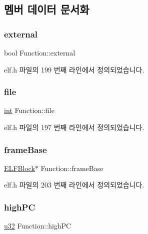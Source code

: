 \subsection{멤버 데이터 문서화}
\mbox{\label{struct_function_ad775b69acac9b0efaea721d30d48afe5}} 
\subsubsection{\texorpdfstring{external}{external}}
{\footnotesize\ttfamily bool Function\+::external}



elf.\+h 파일의 199 번째 라인에서 정의되었습니다.

\mbox{\label{struct_function_a09b77b9d9601b328d7127c62ed93d850}} 
\subsubsection{\texorpdfstring{file}{file}}
{\footnotesize\ttfamily \mbox{\hyperlink{_util_8cpp_a0ef32aa8672df19503a49fab2d0c8071}{int}} Function\+::file}



elf.\+h 파일의 197 번째 라인에서 정의되었습니다.

\mbox{\label{struct_function_af5d7f2b7322272714f24ca36b2199c12}} 
\subsubsection{\texorpdfstring{frame\+Base}{frameBase}}
{\footnotesize\ttfamily \mbox{\hyperlink{struct_e_l_f_block}{E\+L\+F\+Block}}$\ast$ Function\+::frame\+Base}



elf.\+h 파일의 203 번째 라인에서 정의되었습니다.

\mbox{\label{struct_function_ac2bb5cba39265122d94851eba25eb5d6}} 
\subsubsection{\texorpdfstring{high\+PC}{highPC}}
{\footnotesize\ttfamily \mbox{\hyperlink{_system_8h_a10e94b422ef0c20dcdec20d31a1f5049}{u32}} Function\+::high\+PC}




